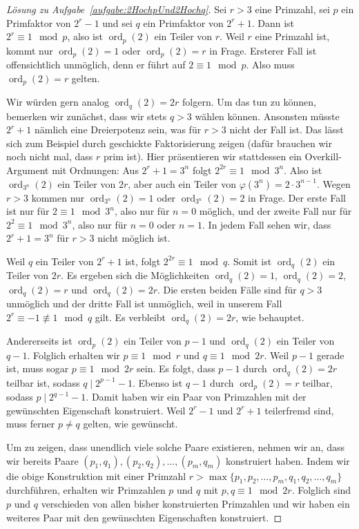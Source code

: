 \begin{proof}[Lösung zu Aufgabe~\ref{aufgabe:2HochpUnd2Hochq}]
	Sei $r>3$ eine Primzahl, sei $p$ ein Primfaktor von $2^r-1$ und sei $q$ ein Primfaktor von $2^r+1$. Dann ist $2^r\equiv 1\mod p$, also ist $\operatorname{ord}_p(2)$ ein Teiler von $r$. Weil $r$ eine Primzahl ist, kommt nur $\operatorname{ord}_p(2)=1$ oder $\operatorname{ord}_p(2)=r$ in Frage. Ersterer Fall ist offensichtlich unmöglich, denn er führt auf $2\equiv 1\mod p$. Also muss $\operatorname{ord}_p(2)=r$ gelten.
	
	Wir würden gern analog $\operatorname{ord}_q(2)=2r$ folgern. Um das tun zu können, bemerken wir zunächst, dass wir stets $q>3$ wählen können. Ansonsten müsste $2^r+1$ nämlich eine Dreierpotenz sein, was für $r>3$ nicht der Fall ist. Das lässt sich zum Beispiel durch geschickte Faktorisierung zeigen (dafür brauchen wir noch nicht mal, dass $r$ prim ist). Hier präsentieren wir stattdessen ein Overkill-Argument mit Ordnungen: Aus $2^r+1=3^n$ folgt $2^{2r}\equiv 1\mod 3^n$. Also ist $\operatorname{ord}_{3^n}(2)$ ein Teiler von $2r$, aber auch ein Teiler von $\varphi(3^n)=2\cdot 3^{n-1}$. Wegen $r>3$ kommen nur $\operatorname{ord}_{3^n}(2)=1$ oder $\operatorname{ord}_{3^n}(2)=2$ in Frage. Der erste Fall ist nur für $2\equiv 1\mod 3^n$, also nur für $n=0$ möglich, und der zweite Fall nur für $2^2\equiv 1\mod 3^n$, also nur für $n=0$ oder $n=1$. In jedem Fall sehen wir, dass $2^r+1=3^n$ für $r>3$ nicht möglich ist.
	
	Weil $q$ ein Teiler von $2^r+1$ ist, folgt $2^{2r}\equiv 1\mod q$. Somit ist $\operatorname{ord}_q(2)$ ein Teiler von $2r$. Es ergeben sich die Möglichkeiten $\operatorname{ord}_q(2)=1$, $\operatorname{ord}_q(2)=2$, $\operatorname{ord}_q(2)=r$ und $\operatorname{ord}_q(2)=2r$. Die ersten beiden Fälle sind für $q>3$ unmöglich und der dritte Fall ist unmöglich, weil in unserem Fall $2^r\equiv -1\not\equiv 1\mod q$ gilt. Es verbleibt $\operatorname{ord}_q(2)=2r$, wie behauptet.
	
	Andererseits ist $\operatorname{ord}_p(2)$ ein Teiler von $p-1$ und $\operatorname{ord}_q(2)$ ein Teiler von $q-1$. Folglich erhalten wir $p\equiv 1\mod r$ und $q\equiv 1\mod 2r$. Weil $p-1$ gerade ist, muss sogar $p\equiv 1\mod 2r$ sein. Es folgt, dass $p-1$ durch $\operatorname{ord}_q(2)=2r$ teilbar ist, sodass $q\mid 2^{p-1}-1$. Ebenso ist $q-1$ durch $\operatorname{ord}_p(2)=r$ teilbar, sodass $p\mid 2^{q-1}-1$. Damit haben wir ein Paar von Primzahlen mit der gewünschten Eigenschaft konstruiert. Weil $2^r-1$ und $2^r+1$ teilerfremd sind, muss ferner $p\neq q$ gelten, wie gewünscht.
	
	Um zu zeigen, dass unendlich viele solche Paare existieren, nehmen wir an, dass wir bereits Paare $(p_1,q_1),(p_2,q_2),\dotsc,(p_m,q_m)$ konstruiert haben. Indem wir die obige Konstruktion mit einer Primzahl $r>\max\{p_1,p_2,\dotsc,p_m,q_1,q_2,\dotsc,q_m\}$ durchführen, erhalten wir Primzahlen $p$ und $q$ mit $p,q\equiv 1\mod 2r$. Folglich sind $p$ und $q$ verschieden von allen bisher konstruierten Primzahlen und wir haben ein weiteres Paar mit den gewünschten Eigenschaften konstruiert.
\end{proof}